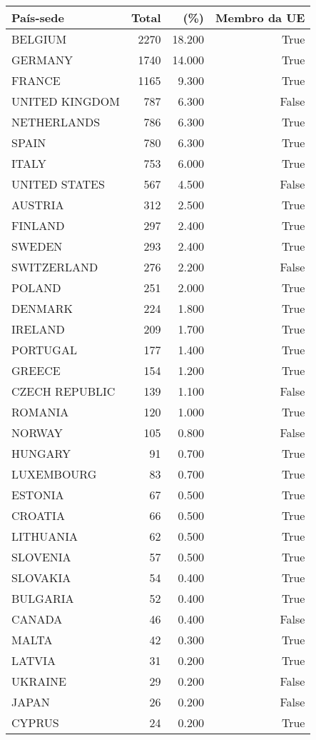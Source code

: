 \begin{tabular}{lrrr}
\toprule
País-sede & Total & (\%) & Membro da UE \\
\midrule
BELGIUM & 2270 & 18.200 & True \\
GERMANY & 1740 & 14.000 & True \\
FRANCE & 1165 & 9.300 & True \\
UNITED KINGDOM & 787 & 6.300 & False \\
NETHERLANDS & 786 & 6.300 & True \\
SPAIN & 780 & 6.300 & True \\
ITALY & 753 & 6.000 & True \\
UNITED STATES & 567 & 4.500 & False \\
AUSTRIA & 312 & 2.500 & True \\
FINLAND & 297 & 2.400 & True \\
SWEDEN & 293 & 2.400 & True \\
SWITZERLAND & 276 & 2.200 & False \\
POLAND & 251 & 2.000 & True \\
DENMARK & 224 & 1.800 & True \\
IRELAND & 209 & 1.700 & True \\
PORTUGAL & 177 & 1.400 & True \\
GREECE & 154 & 1.200 & True \\
CZECH REPUBLIC & 139 & 1.100 & False \\
ROMANIA & 120 & 1.000 & True \\
NORWAY & 105 & 0.800 & False \\
HUNGARY & 91 & 0.700 & True \\
LUXEMBOURG & 83 & 0.700 & True \\
ESTONIA & 67 & 0.500 & True \\
CROATIA & 66 & 0.500 & True \\
LITHUANIA & 62 & 0.500 & True \\
SLOVENIA & 57 & 0.500 & True \\
SLOVAKIA & 54 & 0.400 & True \\
BULGARIA & 52 & 0.400 & True \\
CANADA & 46 & 0.400 & False \\
MALTA & 42 & 0.300 & True \\
LATVIA & 31 & 0.200 & True \\
UKRAINE & 29 & 0.200 & False \\
JAPAN & 26 & 0.200 & False \\
CYPRUS & 24 & 0.200 & True \\

\end{tabular}
